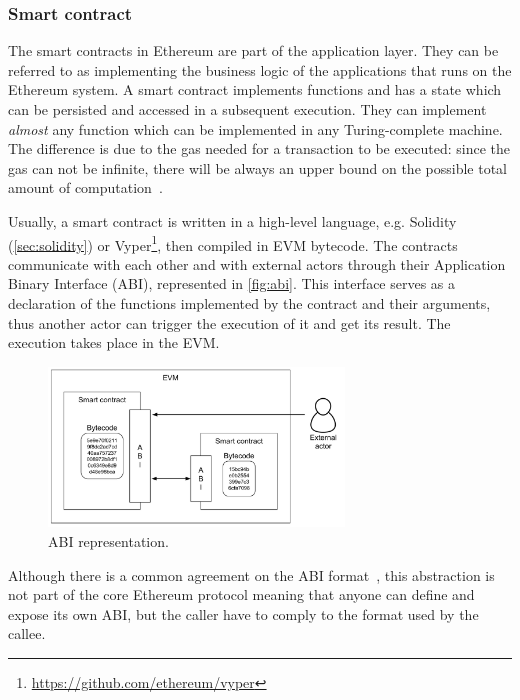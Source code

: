 \subsubsection{Smart contract}
\label{sec:smart-contract}

The smart contracts in Ethereum are part of the application layer. They can be
referred to as implementing the business logic of the applications that runs on
the Ethereum system. A smart contract implements functions and has a state which
can be persisted and accessed in a subsequent execution. They can implement
\emph{almost} any function which can be implemented in any Turing-complete
machine. The difference is due to the gas needed for a transaction to be
executed: since the gas can not be infinite, there will be always an upper
bound on the possible total amount of computation~\cite{wood2018ethereum}.

Usually, a smart contract is written in a high-level language, e.g.
Solidity
(\autoref{sec:solidity}) or
Vyper\footnote{\url{https://github.com/ethereum/vyper}}, then compiled in EVM
bytecode. The contracts communicate with each other and with external actors
through their Application Binary Interface (ABI), represented in
\autoref{fig:abi}. This interface serves as a declaration of the functions
implemented by the contract and their arguments, thus another actor can trigger
the execution of it and get its result. The execution takes place in the EVM.

\begin{figure}
	\begin{center}
		\includegraphics[width=0.7\textwidth]{./res/img/abi.pdf}
	\end{center}
	\caption{ABI representation.}
	\label{fig:abi}
\end{figure}

Although there is a common agreement on the ABI
format~\cite{bib:solidity-docs}, this abstraction is not
part of the core Ethereum protocol meaning that anyone can define and expose its
own ABI, but the caller have to comply to the format used by the callee.

